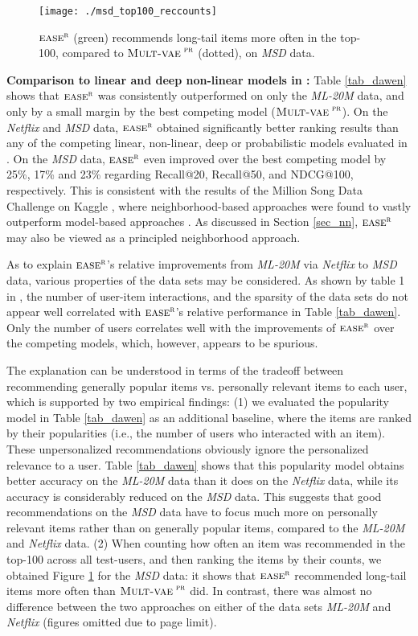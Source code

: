 \documentclass[sigconf]{acmart}
\newcommand{\mvae}{${\textsc{Mult-vae}}^{\textsc{ pr}}$}
\newcommand{\sae}{${\textsc{ease}}^{\textsc{r}}$}
\begin{document}
\begin{figure}[t]
\begin{center}
\texttt{[image: ./msd\_top100\_reccounts]}
\end{center}
\caption{\sae{} (green) recommends  long-tail items more often in the top-100, compared to \mvae{} (dotted), on \emph{MSD} data.}
\label{fig_recs}
\end{figure}



{\bf Comparison to linear and deep non-linear models in \cite{liang18}:}
Table \ref{tab_dawen} shows that \sae{}  was consistently outperformed on only the \emph{ML-20M} data, and only by a small margin by the best competing model (\mvae).  On the  \emph{Netflix} and \emph{MSD} data, \sae{}  obtained significantly better ranking results than any of the competing linear, non-linear, deep or probabilistic models evaluated in \cite{liang18}. On the \emph{MSD} data, \sae{}  even improved over the best competing model by  25\%, 17\% and 23\% regarding Recall@20, Recall@50, and NDCG@100, respectively. This is consistent with the results of the Million Song Data Challenge on Kaggle \cite{mcfee12}, where neighborhood-based approaches were found to vastly outperform model-based approaches \cite{aiolli13}. As discussed in Section \ref{sec_nn}, \sae{}  may also be viewed as a principled neighborhood approach.

As to explain \sae's relative improvements from \emph{ML-20M} via  \emph{Netflix} to \emph{MSD} data, various properties of the data sets may be considered. As shown by table 1 in \cite{liang18}, the number of user-item interactions, and the sparsity of the data sets  do not appear well correlated  with \sae's relative performance in Table \ref{tab_dawen}. Only the number of users correlates well with the improvements of \sae{}  over the competing models, which, however, appears to be spurious.

The explanation can be understood in terms of the tradeoff between recommending generally popular items vs. personally relevant items to each user, which is supported by two empirical findings: (1) we evaluated the popularity model in Table \ref{tab_dawen} as an additional baseline, 
where  the items are ranked by their popularities (i.e.,  the number of users who interacted with an item). These unpersonalized recommendations obviously ignore the personalized relevance to a user. Table \ref{tab_dawen} shows that this  popularity model obtains better accuracy on the \emph{ML-20M} data than it does on the \emph{Netflix} data, while its accuracy is considerably reduced on the \emph{MSD} data. This suggests that good recommendations on the  \emph{MSD} data have to focus much more on personally relevant items rather than on generally popular items, compared to the  \emph{ML-20M} and \emph{Netflix} data. (2) When counting how often an item was recommended in the top-100 across all test-users, and then ranking the items by their counts, we obtained Figure \ref{fig_recs} for the \emph{MSD} data: it shows that \sae{} recommended long-tail items more often than \mvae{} did. In contrast, there was almost no difference  between the two approaches on either of the data sets \emph{ML-20M} and \emph{Netflix} (figures omitted due to page limit).
\end{document}
